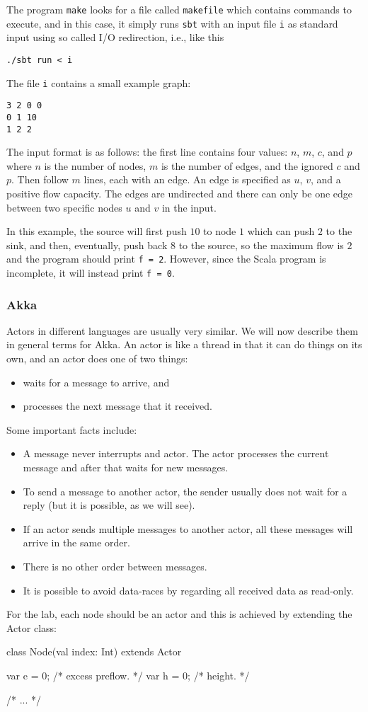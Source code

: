 \documentclass{forsete}
\begin{document}
The program {\tt make} looks for a file called {\tt makefile} which contains commands to execute, and in this
case, it simply runs {\tt sbt} with an input file {\tt i} as standard input using so called I/O redirection, i.e.,
like this
\begin{verbatim}
./sbt run < i
\end{verbatim}
The file {\tt i} contains a small example graph:
\begin{verbatim}
3 2 0 0
0 1 10
1 2 2
\end{verbatim}
The input format is as follows: the first line contains four values: $n$, $m$, $c$, and $p$ where $n$ is the number of nodes, $m$ is the number of edges, and the ignored $c$ and $p$.
Then follow $m$ lines, each with an edge. An edge is specified as $u$, $v$, and a positive flow capacity. The edges
are undirected and there can only be one edge between two specific nodes $u$ and $v$ in the input.

In this example, the source will first push $10$ to node $1$ which can push $2$ to the sink, and then, eventually,
push back $8$ to the source, so the maximum flow is $2$ and the program should print {\tt f = 2}.
However, since the Scala program is incomplete, it will instead print {\tt f = 0}.

\subsubsection*{Akka}
Actors in different languages are usually very similar. We will now describe them in general terms for Akka.
An actor is like a thread in that it can do things on its own, and an actor does one of two things:
\begin{itemize}
\item waits for a message to arrive, and
\item processes the next message that it received.
\end{itemize}
Some important facts include:
\begin{itemize}
\item A message never interrupts and actor. The actor processes the current message and after that waits for new
messages.
\item To send a message to another actor, the sender usually does not wait for a reply (but it is possible, as we will see).
\item If an actor sends multiple messages to another actor, all these messages will arrive in the same order. 
\item There is no other order between messages.
\item It is possible to avoid data-races by regarding all received data as read-only.
\end{itemize}
For the lab, each node should be an actor and this is achieved by extending the Actor class:
\begin{ccode}
class Node(val index: Int) extends Actor {
	var	e = 0;				/* excess preflow. 						*/
	var	h = 0;				/* height. 							*/
   
        /* ... */
}
\end{ccode}
\end{document}
